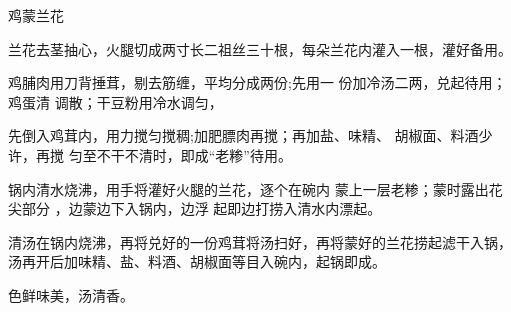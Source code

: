 \begin{recipe}{鸡蒙兰花}

\ingredients


\cooking

\step 兰花去茎抽心，火腿切成两寸长二祖丝三十根，每朵兰花内灌入一根，灌好备用。

鸡脯肉用刀背捶茸，剔去筋缠，平均分成两份;先用一 份加冷汤二两，兑起待用；鸡蛋清
调散；干豆粉用冷水调匀，

先倒入鸡茸内，用力搅匀搅稠;加肥膘肉再搅；再加盐、味精、 胡椒面、料酒少许，再搅
匀至不干不清时，即成“老糁”待用。

锅内清水烧沸，用手将灌好火腿的兰花，逐个在碗内 蒙上一层老糁；蒙时露出花尖部分
，边蒙边下入锅内，边浮 起即边打捞入清水内漂起。

\step 清汤在锅内烧沸，再将兑好的一份鸡茸将汤扫好，再将蒙好的兰花捞起滤干入锅，
汤再开后加味精、盐、料酒、胡椒面等目入碗内，起锅即成。

\features

色鲜味美，汤清香。

\end{recipe}

